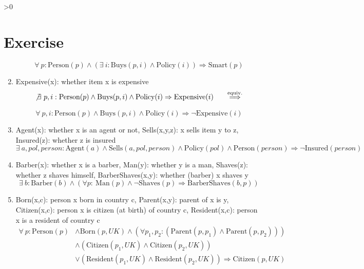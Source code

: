 \documentclass{article}
\newcounter{partCounter}
\newcounter{ExerciseCounter}
\newenvironment{Exercise}[1][-1]{
	\ifnum#1>0
	\setcounter{ExerciseCounter}{#1}
	\fi
	\section{Exercise \arabic{ExerciseCounter}}
	\setcounter{partCounter}{1}
}{
}
\begin{document}
\begin{Exercise}[1]
\begin{enumerate}
    $$\forall ~p : \text{Person}(p) \wedge \left( \exists ~i: \text{Buys}(p,i) \wedge \text{Policy}(i) \right) \Rightarrow \text{Smart}(p) $$
    
   	\vspace{15pt}
   	
    \item Expensive(x): whether item x is expensive \\
    
    $$ \not \exists ~p,i : \text{Person}(p) \wedge \text{Buys}(p,i) \wedge \text{Policy}(i) \Rightarrow \text{Expensive}(i) ~~~~~\overset{\text{equiv.}}{\Longrightarrow}$$
    
    $$ \forall ~p,i:  \text{Person}(p) \wedge \text{Buys}(p,i) \wedge \text{Policy}(i) \Rightarrow \neg \text{Expensive}(i)  $$
    
   	\vspace{15pt}
    
    \item Agent(x): whether x is an agent or not, Sells(x,y,z): x sells item y to z, Insured(z): whether z is insured \\
    
    $$\exists ~a,pol,person: \text{Agent}(a) \wedge \text{Sells}(a,pol,person) \wedge \text{Policy}(pol) \wedge \text{Person}(person) \Rightarrow \neg \text{Insured}(person) $$
    
    \vspace{15pt}
    
    \item Barber(x): whether x is a barber, Man(y): whether y is a man, Shaves(z): whether z shaves himself, BarberShaves(x,y): whether (barber) x shaves y \\
    
    $$\displaystyle \exists ~b: \text{Barber}(b) \wedge \left( \forall p: ~\text{Man}(p) \wedge \neg \text{Shaves}(p) \Rightarrow \text{BarberShaves}(b,p) \right) $$
    
    \vspace{15pt}
    	
    \item Born(x,c): person x born in country c, Parent(x,y): parent of x is y, Citizen(x,c): person x is citizen (at birth) of country c, Resident(x,c): person x is a resident of country c \\
    
    \begin{equation*}
    	\begin{aligned}
    		\forall ~p: \text{Person}(p) & \wedge \text{Born}(p,UK) \wedge \left( \forall p_1, p_2: \left( \text{Parent}(p,p_1) \wedge \text{Parent}(p,p_2) \right) \right) \\
    		& \wedge \left( \text{Citizen}(p_1,UK)\wedge\text{Citizen}(p_2,UK) \right) \\
    		& \vee \left( \text{Resident}(p_1,UK)\wedge\text{Resident}(p_2,UK) \right) \Rightarrow \text{Citizen}(p,UK)
    	\end{aligned}
    \end{equation*}
    

\end{enumerate}
\end{Exercise}
\end{document}
